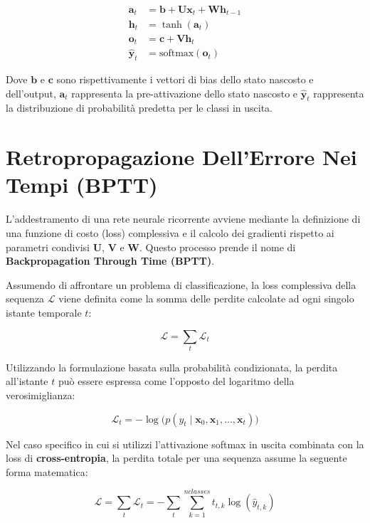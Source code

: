 ﻿\documentclass[11pt, a4paper]{article}
\begin{document}
\begin{align*}
\bm{a}_t &= \bm{b} + \bm{U}\bm{x}_t + \bm{W}\bm{h}_{t-1} \\
\bm{h}_t &= \tanh(\bm{a}_t) \\
\bm{o}_t &= \bm{c} + \bm{V}\bm{h}_t \\
\hat{\bm{y}}_t &= \text{softmax}(\bm{o}_t)
\end{align*}

Dove $\bm{b}$ e $\bm{c}$ sono rispettivamente i vettori di bias dello stato nascosto e dell'output, $\bm{a}_t$ rappresenta la pre-attivazione dello stato nascosto e $\hat{\bm{y}}_t$ rappresenta la distribuzione di probabilità predetta per le classi in uscita.


\newpage

\section{Retropropagazione Dell'Errore Nei Tempi (BPTT)}

L'addestramento di una rete neurale ricorrente avviene mediante la definizione di una funzione di costo (loss) complessiva e il calcolo dei gradienti rispetto ai parametri condivisi $\bm{U}$, $\bm{V}$ e $\bm{W}$. Questo processo prende il nome di \textbf{Backpropagation Through Time (BPTT)}.

Assumendo di affrontare un problema di classificazione, la loss complessiva della sequenza $\mathcal{L}$ viene definita come la somma delle perdite calcolate ad ogni singolo istante temporale $t$:

\[
\mathcal{L} = \sum_{t} \mathcal{L}_t
\]

Utilizzando la formulazione basata sulla probabilità condizionata, la perdita all'istante $t$ può essere espressa come l'opposto del logaritmo della verosimiglianza:

\[
\mathcal{L}_t = -\log\big(p(y_t \mid \bm{x}_0, \bm{x}_1, \dots, \bm{x}_t)\big)
\]

Nel caso specifico in cui si utilizzi l'attivazione softmax in uscita combinata con la loss di \textbf{cross-entropia}, la perdita totale per una sequenza assume la seguente forma matematica:

\[
\mathcal{L} = \sum_{t} \mathcal{L}_t = -\sum_{t} \sum_{k=1}^{nclasses} t_{t,k} \log(\hat{y}_{t,k})
\]
\end{document}
